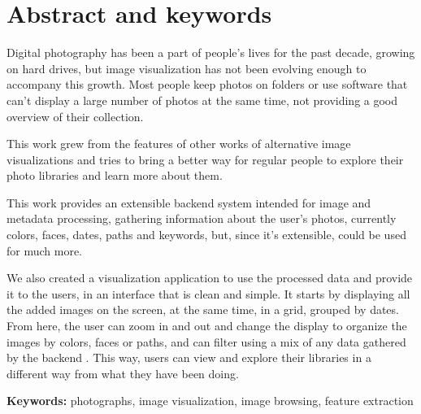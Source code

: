 
\chapter*{Abstract and keywords}


Digital photography has been a part of people's lives for the past decade, growing on hard drives, but image visualization has not been evolving enough to accompany this growth. Most people keep photos on folders or use software that can't display a large number of photos at the same time, not providing a good overview of their collection.

This work grew from the features of other works of alternative image visualizations and tries to bring a better way for regular people to explore their photo libraries and learn more about them.

This work provides an extensible backend system intended for image and metadata processing, gathering information about the user's photos, currently colors, faces, dates, paths and keywords, but, since it's extensible, could be used for much more.

We also created a visualization application to use the processed data and provide it to the users, in an interface that is clean and simple. It starts by displaying all the added images on the screen, at the same time, in a grid, grouped by dates. From here, the user can zoom in and out and change the display to organize the images by colors, faces or paths, and can filter using a mix of any data gathered by the backend . This way, users can view and explore their libraries in a different way from what they have been doing.

\vfill

\textbf{Keywords:} photographs, image visualization, image browsing, feature extraction

\cleardoublepage

